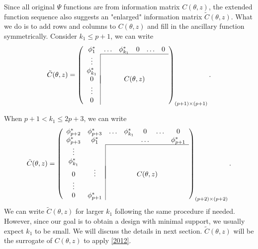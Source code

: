 \documentclass[11pt]{amsart}
\newtheorem{theorem}{Theorem}[section]
\theoremstyle{definition}
\theoremstyle{remark}
\begin{document}
Since all original $\Psi$ functions are from information matrix $C(\theta,z)$, the extended function sequence also suggests an "enlarged" information matrix $\tilde{C}(\theta,z)$. What we do is to add rows and columns to $C(\theta,z)$ and fill in the ancillary function symmetrically. Consider $k_1\le p+1$, we can write \begin{equation}
   \tilde{C}(\theta,z) = \left ( \begin{array}{c|ccccc}
\multicolumn{1}{c}{\phi^*_1}& \ldots& \phi^*_{k_1} &0 &\ldots& 0\\\cline{2-6}
\vdots &  &&&&\\
\phi^*_{k_1} &&&&&\\
0 &\multicolumn{5}{|c}{C(\theta,z)}\\
\vdots &&&&&\\
0&&&&&
\end{array}\right)_{(p+1)\times (p+1)}.
\end{equation} 

When $ p+1< k_1 \le2p+3$, we can write\begin{equation}
   \tilde{C}(\theta,z) = \left ( \begin{array}{cc|ccccc}
\phi^*_{p+2}& \multicolumn{1}{c}{\phi^*_{p+3}}&  \ldots& \phi^*_{k_1} &0 &\ldots& 0\\
\phi^*_{p+3}&\multicolumn{1}{c}{\phi^*_{1}}& && \ldots&& \phi^*_{p+1}\\\cline{3-7}
\vdots &  &&&&&\\
\phi^*_{k_1} &&&&&\\
0 &\vdots &\multicolumn{5}{|c}{C(\theta,z)}\\
\vdots &&&&&&\\
0&\phi^*_{p+1}&&&&&
\end{array}\right)_{(p+2)\times (p+2)}.
\end{equation} We can write $\tilde{C}(\theta,z)$ for larger $k_1$ following the same procedure if needed. However, since our goal is to obtain a design with minimal support, we usually expect $k_1$ to be small. We will discuss the details in next section. $\tilde{C}(\theta,z)$ will be the surrogate of $C(\theta,z)$ to apply \ref{2012}.



\end{document}
